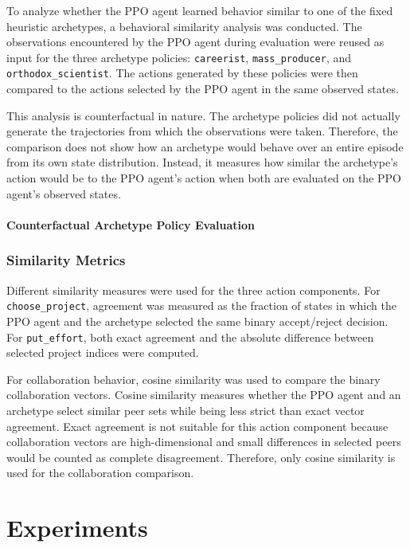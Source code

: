 \documentclass[english,bachelor]{hsluthesis}
\begin{document}
To analyze whether the PPO agent learned behavior similar to one of the fixed heuristic archetypes, a behavioral similarity analysis was conducted. The observations encountered by the PPO agent during evaluation were reused as input for the three archetype policies: \texttt{careerist}, \texttt{mass\_producer}, and \texttt{orthodox\_scientist}. The actions generated by these policies were then compared to the actions selected by the PPO agent in the same observed states.

This analysis is counterfactual in nature. The archetype policies did not actually generate the trajectories from which the observations were taken. Therefore, the comparison does not show how an archetype would behave over an entire episode from its own state distribution. Instead, it measures how similar the archetype's action would be to the PPO agent's action when both are evaluated on the PPO agent's observed states.

\subsubsection{Counterfactual Archetype Policy Evaluation}

\subsection{Similarity Metrics}

Different similarity measures were used for the three action components. For \texttt{choose\_project}, agreement was measured as the fraction of states in which the PPO agent and the archetype selected the same binary accept/reject decision. For \texttt{put\_effort}, both exact agreement and the absolute difference between selected project indices were computed.

For collaboration behavior, cosine similarity was used to compare the binary collaboration vectors. Cosine similarity measures whether the PPO agent and an archetype select similar peer sets while being less strict than exact vector agreement. Exact agreement is not suitable for this action component because collaboration vectors are high-dimensional and small differences in selected peers would be counted as complete disagreement. Therefore, only cosine similarity is used for the collaboration comparison.



\chapter{Experiments}
\end{document}

